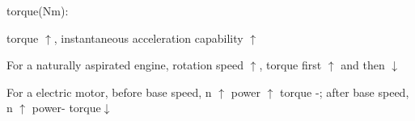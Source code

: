\begin{frame}
	\begin{block}{}
		\begin{compactitem}
			\item torque(Nm):
				\begin{compactenum}
					\item torque $\uparrow$, instantaneous acceleration capability $\uparrow$
					\item For a naturally aspirated engine, rotation speed $\uparrow$, torque first $\uparrow$ and then $\downarrow$
					\item For a electric motor, before base speed, n $\uparrow$ power $\uparrow$ torque -; after base speed, n $\uparrow$ power- torque$\downarrow$
				\end{compactenum}
		\end{compactitem}
	\end{block}
\end{frame}
